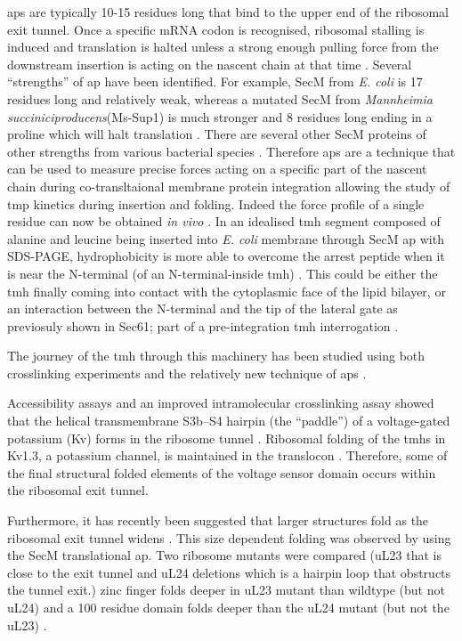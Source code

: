 \gls{ap}s are typically 10-15 residues long that bind to the upper end of the ribosomal exit tunnel.
Once a specific mRNA codon is recognised, ribosomal stalling is induced \cite{Ito2010} and translation is halted unless a strong enough pulling force from the downstream insertion is acting on the nascent chain at that time \cite{Butkus2013}.
Several ``strengths'' of \gls{ap} have been identified.
For example, SecM from \textit{E. coli} is 17 residues long and relatively weak, whereas a mutated SecM from \textit{Mannheimia succiniciproducens}(Ms-Sup1) is much stronger and 8 residues long ending in a proline which will halt translation \cite{Ismail2012}.
There are several other SecM proteins of other strengths from various bacterial species \cite{Yap2009}.
Therefore \gls{ap}s are a technique that can be used to measure precise forces acting on a specific part of the nascent chain during co-transltaional membrane protein integration allowing the study of \gls{tmp} kinetics during insertion and folding.
Indeed the force profile of a single residue can now be obtained \textit{in vivo} \cite{Ismail2012}.
In an idealised \gls{tmh} segment composed of alanine and leucine being inserted into \textit{E. coli} membrane through SecM \gls{ap} with SDS-PAGE, hydrophobicity is more able to overcome the arrest peptide when it is near the N-terminal (of an N-terminal-inside \gls{tmh}) \cite{Ismail2012}.
This could be either the \gls{tmh} finally coming into contact with the cytoplasmic face of the lipid bilayer, or an interaction between the N-terminal and the tip of the lateral gate as previosuly shown in Sec61; part of a pre-integration \gls{tmh} interrogation \cite{MacKinnon2014}.

The journey of the \gls{tmh} through this machinery has been studied using both crosslinking experiments and the relatively new technique of \gls{ap}s \cite{Cymer2015}.

Accessibility assays and an improved intramolecular crosslinking assay showed that the helical transmembrane S3b–S4 hairpin (the “paddle”) of a voltage-gated potassium (Kv) forms in the ribosome tunnel \cite{Tu2014}.
Ribosomal folding of the \gls{tmh}s in Kv1.3, a potassium channel, is maintained in the translocon \cite{Tu2010}.
Therefore, some of the final structural folded elements of the voltage sensor domain occurs within the ribosomal exit tunnel.

Furthermore, it has recently been suggested that larger structures fold as the ribosomal exit tunnel widens \cite{Kudva2018}.
This size dependent folding was observed by using the SecM translational \gls{ap}.
Two ribosome mutants were compared (uL23 that is close to the exit tunnel and uL24 deletions which is a hairpin loop that obstructs the tunnel exit.) zinc finger folds deeper in uL23 mutant than wildtype (but not uL24) and a 100 residue domain folds deeper than the uL24 mutant (but not the uL23) \cite{Kudva2018}.

